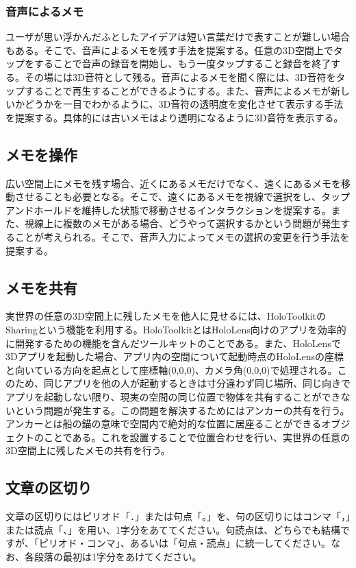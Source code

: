 \documentclass{hissymp}
\begin{document}
\subsubsection{音声によるメモ}
ユーザが思い浮かんだふとしたアイデアは短い言葉だけで表すことが難しい場合もある。そこで、音声によるメモを残す手法を提案する。任意の3D空間上でタップをすることで音声の録音を開始し、もう一度タップすること録音を終了する。その場には3D音符として残る。音声によるメモを聞く際には、3D音符をタップすることで再生することができるようにする。また、音声によるメモが新しいかどうかを一目でわかるように、3D音符の透明度を変化させて表示する手法を提案する。具体的には古いメモはより透明になるように3D音符を表示する。
\subsection{メモを操作}
広い空間上にメモを残す場合、近くにあるメモだけでなく、遠くにあるメモを移動させることも必要となる。そこで、遠くにあるメモを視線で選択をし、タップアンドホールドを維持した状態で移動させるインタラクションを提案する。また、視線上に複数のメモがある場合、どうやって選択するかという問題が発生することが考えられる。そこで、音声入力によってメモの選択の変更を行う手法を提案する。
\subsection{メモを共有}
実世界の任意の3D空間上に残したメモを他人に見せるには、HoloToolkit\cite{tex6}のSharing\cite{tex7}という機能を利用する。HoloToolkitとはHoloLens向けのアプリを効率的に開発するための機能を含んだツールキットのことである。また、HoloLensで3Dアプリを起動した場合、アプリ内の空間について起動時点のHoloLensの座標と向いている方向を起点として座標軸(0,0,0)、カメラ角(0,0,0)で処理される。このため、同じアプリを他の人が起動するときは寸分違わず同じ場所、同じ向きでアプリを起動しない限り、現実の空間の同じ位置で物体を共有することができないという問題が発生する。この問題を解決するためにはアンカーの共有を行う。アンカーとは船の錨の意味で空間内で絶対的な位置に居座ることができるオブジェクトのことである。これを設置することで位置合わせを行い、実世界の任意の3D空間上に残したメモの共有を行う。

\subsection{文章の区切り}
文章の区切りにはピリオド「．」または句点「。」を、句の区切りにはコンマ「，」または読点「、」を用い、1字分をあててください。句読点は、どちらでも結構ですが、「ピリオド・コンマ」、あるいは「句点・読点」に統一してください。なお、各段落の最初は1字分をあけてください。
\end{document}
